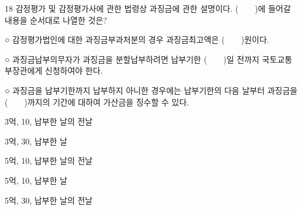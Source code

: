 \begin{question}{18}
감정평가 및 감정평가사에 관한 법령상 과징금에 관한 설명이다. (　　)에 들어갈 내용을 순서대로 나열한 것은?
\begin{framedtext}
○ 감정평가법인에 대한 과징금부과처분의 경우 과징금최고액은 (　　)원이다. \par
○ 과징금납부의무자가 과징금을 분할납부하려면 납부기한 (　　)일 전까지 국토교통부장관에게 신청하여야 한다. \par
○ 과징금을 납부기한까지 납부하지 아니한 경우에는 납부기한의 다음 날부터 과징금을 (　　)까지의 기간에 대하여 가산금을 징수할 수 있다. \par
\end{framedtext}
\begin{choices}
  \item 3억, 10, 납부한 날의 전날
  \item 3억, 30, 납부한 날
  \item 5억, 10, 납부한 날의 전날
  \item 5억, 10, 납부한 날
  \item 5억, 30, 납부한 날의 전날
\end{choices}
\end{question}

